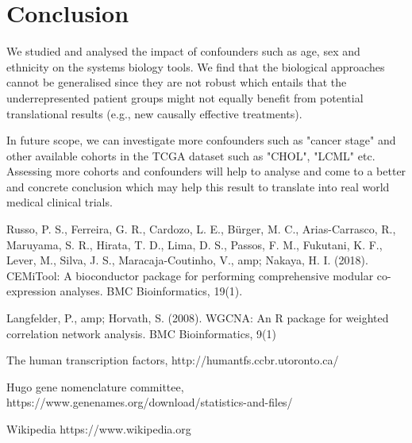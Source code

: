 \documentclass[a4paper]{paper}
\begin{document}
\section{Conclusion}
We studied and analysed the impact of confounders such as age, sex and ethnicity on the systems biology tools. We find that the biological approaches cannot be generalised since they are not robust which entails that the underrepresented patient groups might not equally benefit from potential translational results (e.g., new causally
effective treatments).

\bigskip

\noindent In future scope, we can investigate more confounders such as "cancer stage" and other available cohorts in the TCGA dataset such as "CHOL", "LCML" etc. Assessing more cohorts and confounders will help to analyse and come to a better and concrete conclusion which may help this result to translate into real world medical clinical trials. 




\bigskip

\noindent [RFCB] Russo, P. S., Ferreira, G. R., Cardozo, L. E., Bürger, M. C., Arias-Carrasco, R., Maruyama, S. R., Hirata, T. D., Lima, D. S.,
Passos, F. M., Fukutani, K. F., Lever, M., Silva, J. S.,
Maracaja-Coutinho, V., amp; Nakaya, H. I. (2018). CEMiTool: A
bioconductor package for performing comprehensive modular
co-expression analyses. BMC Bioinformatics, 19(1).

\bigskip

\noindent[LPH] Langfelder, P., amp; Horvath, S. (2008). WGCNA: An R package for weighted correlation network analysis. BMC Bioinformatics,
9(1)

\bigskip

\noindent The human transcription factors, http://humantfs.ccbr.utoronto.ca/

\bigskip

\noindent Hugo gene nomenclature committee,
https://www.genenames.org/download/statistics-and-files/

\bigskip

\noindent Wikipedia
https://www.wikipedia.org
\end{document}
